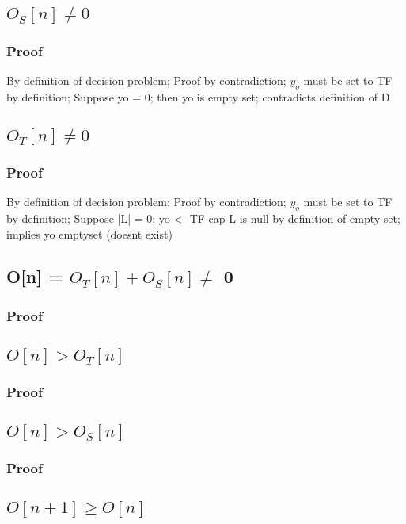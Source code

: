 \documentclass[11pt]{article}
\begin{document}
\subsection{$O_S[n] \neq 0$}
\subsubsection{Proof}
By definition of decision problem; Proof by contradiction; $y_o$ must be set to TF by definition; Suppose yo = 0; then yo is empty set; contradicts definition of D

\subsection{$O_T[n] \neq 0$}
\subsubsection{Proof}
By definition of decision problem; Proof by contradiction; $y_o$ must be set to TF by definition; Suppose |L| = 0; yo <- TF cap L is null by definition of empty set; implies yo emptyset (doesnt exist)

\subsection{O[n] = $O_T[n] + O_S[n] \neq$ 0}
\subsubsection{Proof}

\subsection{$O[n] > O_T[n]$}
\subsubsection{Proof}

\subsection{$O[n] > O_S[n]$}
\subsubsection{Proof}


\subsection{$O[n+1] \geq O[n]$}
\end{document}
